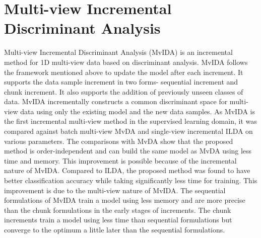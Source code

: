 \section{Multi-view Incremental Discriminant Analysis}
\label{sec:Conc_MvIDA}
Multi-view Incremental Discriminant Analysis (MvIDA) is an incremental method for 1D multi-view data based on discriminant analysis. MvIDA follows the framework mentioned above to update the model after each increment. It supports the data sample increment in two forms- sequential increment and chunk increment. It also supports the addition of previously unseen classes of data. MvIDA incrementally constructs a common discriminant space for multi-view data using only the existing model and the new data samples. As MvIDA is the first incremental multi-view method in the supervised learning domain, it was compared against batch multi-view MvDA and single-view incremental ILDA on various parameters. The comparisons with MvDA show that the proposed method is order-independent and can build the same model as MvDA using less time and memory. This improvement is possible because of the incremental nature of MvIDA. Compared to ILDA, the proposed method was found to have better classification accuracy while taking significantly less time for training. This improvement is due to the multi-view nature of MvIDA. The sequential formulations of MvIDA train a model using less memory and are more precise than the chunk formulations in the early stages of increments. The chunk increments train a model using less time than sequential formulations but converge to the optimum a little later than the sequential formulations.


